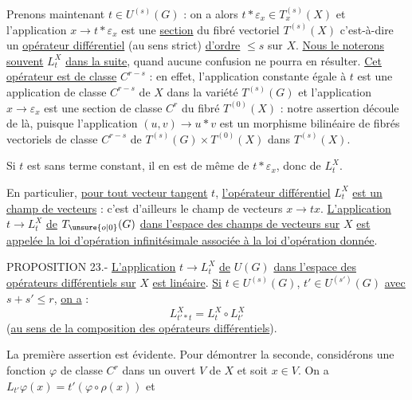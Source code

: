 
Prenons maintenant $t\in U^{(s)}(G)$ : on a alors $t*\varepsilon_x\in T_x^{(s)}(X)$ et l'application $x\longrightarrow t*\varepsilon_x$ est une \uline{section} du fibré vectoriel $T^{(s)}(X)$ c'est-à-dire un \uline{opérateur différentiel} (au sens strict) \uline{d'ordre} $\leq s$ sur $X$. \uline{Nous le noterons souvent} $L_t^X$ \uline{dans la suite}, quand aucune confusion ne pourra en résulter. \uline{Cet opérateur est de classe} $C^{r-s}$ : en effet, l'application constante égale à $t$ est une application de classe $C^{r-s}$ de $X$ dans la variété $T^{(s)}(G)$ et l'application $x\longrightarrow\varepsilon_x$ est une section de classe $C^r$ du fibré $T^{(0)}(X)$ : notre assertion découle de là, puisque l'application $(u,v)\longrightarrow u*v$ est un morphisme bilinéaire de fibrés vectoriels de classe $C^{r-s}$ de $T^{(s)}(G)\times T^{(0)}(X)$ dans $T^{(s)}(X)$.

Si $t$ est sans terme constant, il en est de même de $t*\varepsilon_x$, donc de $L_t^X$.

En particulier, \uline{pour tout vecteur tangent} $t$, \uline{l'opérateur différentiel} $L_t^X$ \uline{est un champ de vecteurs} : c'est d'ailleurs le champ de vecteurs $x\longrightarrow tx$. \uline{L'application} $t\longrightarrow L_t^X$ \uline{de} $T_{\unsure{o|0}}(G)$ \uline{dans l'espace des champs de vecteurs sur} $X$ \uline{est appelée la loi d'opération infinitésimale associée à la loi d'opération donnée}.

PROPOSITION 23.- \uline{L'application} $t\longrightarrow L_t^X$ \uline{de} $U(G)$ \uline{dans l'espace des opérateurs différentiels sur} $X$ \uline{est linéaire}. \uline{Si} $t\in U^{(s)}(G)$, $t'\in U^{(s')}(G)$ \uline{avec} $s+s'\leq r$, \uline{on a} :
\[
L_{t'*t}^X=L_t^X\circ L_{t'}^X
\]
(\uline{au sens de la composition des opérateurs différentiels}).

La première assertion est évidente. Pour démontrer la seconde, considérons une fonction $\varphi$ de classe $C^r$ dans un ouvert $V$ de $X$ et soit $x\in V$. On a $L_{t'}\varphi(x)=t'(\varphi\circ\rho(x))$ et
